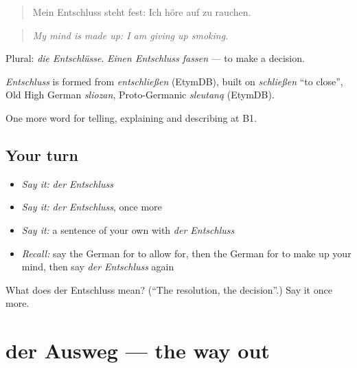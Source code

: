 \begin{quote}
Mein Entschluss steht fest: Ich höre auf zu rauchen.
\end{quote}

\begin{quote}
\emph{My mind is made up: I am giving up smoking.}
\end{quote}

Plural: \emph{die Entschlüsse}. \emph{Einen Entschluss fassen} — to make a decision.

\begin{cousinweb}
\emph{Entschluss} is formed from \emph{entschließen} (EtymDB), built on \emph{schließen} \textquotedblleft{}to close\textquotedblright{}, Old High German \emph{sliozan}, Proto-Germanic \emph{sleutaną} (EtymDB).
\end{cousinweb}

\begin{grammarlens}[title={What you've built}]
One more word for telling, explaining and describing at B1.
\end{grammarlens}

\subsection*{Your turn}
\begin{itemize}
\raggedright
  \item \emph{Say it:} \emph{der Entschluss}
  \item \emph{Say it:} \emph{der Entschluss}, once more
  \item \emph{Say it:} a sentence of your own with \emph{der Entschluss}
  \item \emph{Recall:} say the German for to allow for, then the German for to make up your mind, then say \emph{der Entschluss} again
\end{itemize}

\begin{tcolorbox}[breakable,colback=teal!4,colframe=teal!35!black,title={Before you move on}]
What does der Entschluss mean? (\textquotedblleft{}The resolution, the decision\textquotedblright{}.) Say it once more.
\end{tcolorbox}
\section[der Ausweg]{der Ausweg — the way out}

\label{lesson:GE-C374-ausweg}



